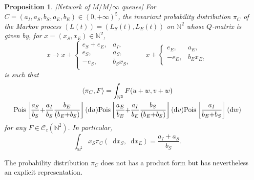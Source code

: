 \documentclass[english]{amsart}
\newcommand{\N}{\ensuremath{\mathbb{N}}}
\newcommand{\diff}{\mathop{}\mathopen{}\mathrm{d}}
\newcommand{\cal}[1]{\ensuremath{\mathcal{#1}}}
\newcommand\croc[1]{\left\langle #1\right\rangle}
\newcommand\Pois[1]{{\rm Pois}\left[#1\right]}
\newtheorem{proposition}{Proposition}
\numberwithin{proposition}{section}
\begin{document}
\begin{proposition}\label{MMN}[Network of $M/M/\infty$ queues]\label{MMNet}
For $C{=}(a_I,a_S,b_S,a_E,b_E){\in}(0,{+}\infty)^5$, the invariant probability distribution $\pi_C$ of the Markov process $(L(t)){=}(L_S(t),L_E(t))$ on $\N^2$ whose $Q$-matrix is given by, for $x{=}(x_S,x_E){\in}\N^2$, 
\begin{equation}\label{QMat}
x{\longrightarrow} x{+}
\begin{cases}
e_S{+}e_E,& a_I,\\
 e_S,&a_S,\\
 {-}e_S,&b_Sx_S,\\
\end{cases}
\qquad x{+}
\begin{cases}
e_E,& a_E,\\
{-}e_E,&b_Ex_E,\\
\end{cases}
\end{equation}
is such that
\begin{multline}\label{InvDistMMN}
  \croc{\pi_C,F}=\int_{\N^3}F(u+w,v+w)\\\Pois{\frac{a_S}{b_S}{+}\frac{a_I}{b_S}\frac{b_E}{(b_E{+}b_S)}}(\diff u)\Pois{\frac{a_E}{b_E}{+}\frac{a_I}{b_E}\frac{b_S}{(b_E{+}b_S)}}(\diff v)\Pois{\frac{a_I}{b_E{+}b_S}}(\diff w)
\end{multline}
for any $F{\in}{\cal C}_c(\N^2)$. In particular,
\begin{equation}\label{MMIExp}
  \int_{\N^2} x_S\pi_{C}(\diff x_S,\diff x_E)=\frac{a_I{+}a_S}{b_S}.
\end{equation}
\end{proposition}
The probability distribution $\pi_C$ does not has a product form but has nevertheless an explicit representation.
\end{document}
